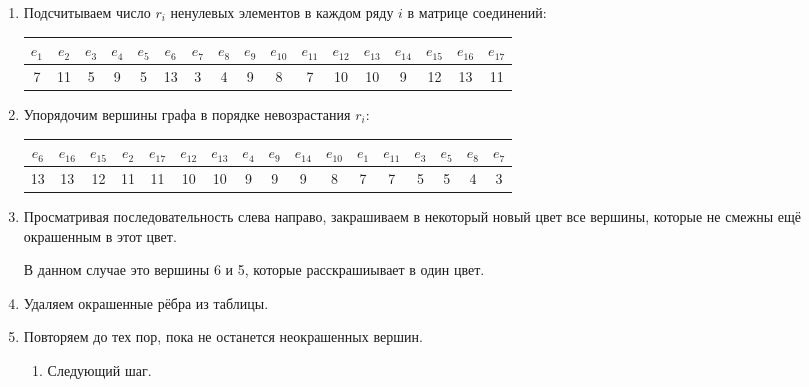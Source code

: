 \documentclass[12pt, a4paper] {ncc}
\begin{document}
\begin{enumerate}

\item Подсчитываем число $r_i$ ненулевых элементов в каждом ряду $i$ в матрице
соединений:

\begin{center}
\begin{longtable}{|c c c c c c c c c c c c c c c c c|}
\hline
$e_{1}$ & $e_{2}$ & $e_{3}$ & $e_{4}$ & $e_{5}$ & $e_{6}$ & $e_{7}$ & $e_{8}$ & $e_{9}$ & $e_{10}$& $e_{11}$& $e_{12}$& $e_{13}$& $e_{14}$& $e_{15}$& $e_{16}$& $e_{17}$ \\
\hline
7 & 11 & 5 & 9 & 5 & 13 & 3 & 4 & 9 & 8 & 7 & 10 & 10 & 9 & 12 & 13 & 11 \\
\hline
\end{longtable}
\end{center}

\item Упорядочим вершины графа в порядке невозрастания $r_i$:

\begin{center}
\begin{longtable}{|c c c c c c c c c c c c c c c c c|}
\hline
$e_{6}$ & $e_{16}$  & $e_{15}$  & $e_{2}$  & $e_{17}$ & $e_{12}$  & $e_{13}$ & $e_{4}$ & $e_{9}$  & $e_{14}$ & $e_{10}$ & $e_{1}$ & $e_{11}$  & $e_{3}$ & $e_{5}$  & $e_{8}$  & $e_{7}$ \\
\hline
13 & 13 & 12 & 11 & 11 & 10 & 10 & 9 & 9 & 9 & 8 & 7 & 7 & 5 & 5 & 4 & 3 \\ \hline
\end{longtable}
\end{center}


\item Просматривая последовательность слева направо, закрашиваем в некоторый
новый цвет все вершины, которые не смежны ещё окрашенным в этот цвет.

В данном случае это вершины 6 и 5, которые расскрашиывает в один цвет.

\item Удаляем окрашенные рёбра из таблицы.

\item Повторяем до тех пор, пока не останется неокрашенных вершин.
    \begin{enumerate}
        \item Следующий шаг.


\end{enumerate}
\end{enumerate}
\end{document}
